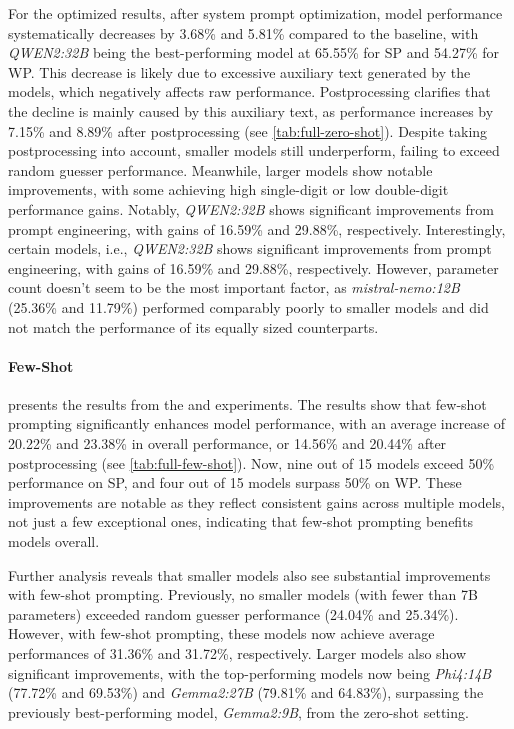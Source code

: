 For the optimized results, after system prompt optimization, model performance systematically decreases by 3.68\% and 5.81\% compared to the baseline, with \textit{QWEN2:32B} being the best-performing model at 65.55\% for \ac{SP} and 54.27\% for \ac{WP}. This decrease is likely due to excessive auxiliary text generated by the models, which negatively affects raw performance. Postprocessing clarifies that the decline is mainly caused by this auxiliary text, as performance increases by 7.15\% and 8.89\% after postprocessing (see \cref{tab:full-zero-shot}). Despite taking postprocessing into account, smaller models still underperform, failing to exceed random guesser performance. Meanwhile, larger models show notable improvements, with some achieving high single-digit or low double-digit performance gains. Notably, \textit{QWEN2:32B} shows significant improvements from prompt engineering, with gains of 16.59\% and 29.88\%, respectively. Interestingly, certain models, i.e., \textit{QWEN2:32B} shows significant improvements from prompt engineering, with gains of 16.59\% and 29.88\%, respectively. However, parameter count doesn't seem to be the most important factor, as \textit{mistral-nemo:12B} (25.36\% and 11.79\%) performed comparably poorly to smaller models and did not match the performance of its equally sized counterparts.

\paragraph{Few-Shot}

 presents the results from the  and  experiments. The results show that few-shot prompting significantly enhances model performance, with an average increase of 20.22\% and 23.38\% in overall performance, or 14.56\% and 20.44\% after postprocessing (see \cref{tab:full-few-shot}). Now, nine out of 15 models exceed 50\% performance on \ac{SP}, and four out of 15 models surpass 50\% on \ac{WP}. These improvements are notable as they reflect consistent gains across multiple models, not just a few exceptional ones, indicating that few-shot prompting benefits models overall.

Further analysis reveals that smaller models also see substantial improvements with few-shot prompting. Previously, no smaller models (with fewer than 7B parameters) exceeded random guesser performance (24.04\% and 25.34\%). However, with few-shot prompting, these models now achieve average performances of 31.36\% and 31.72\%, respectively. Larger models also show significant improvements, with the top-performing models now being \textit{Phi4:14B} (77.72\% and 69.53\%) and \textit{Gemma2:27B} (79.81\% and 64.83\%), surpassing the previously best-performing model, \textit{Gemma2:9B}, from the zero-shot setting.


